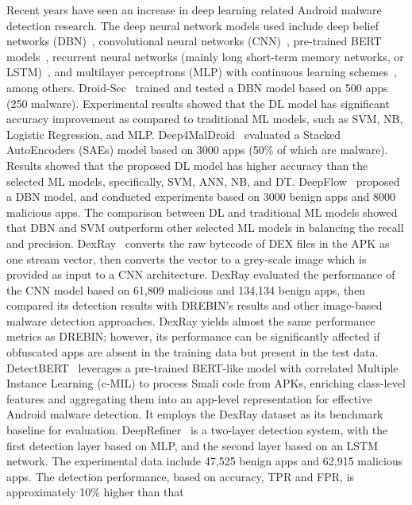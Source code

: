 Recent years have seen an increase in deep learning related Android malware detection
research.  The deep neural network models used include deep belief
networks (DBN)~\cite{Yuan:SIGCOMM14, Su:TrustCom16}, convolutional
neural networks (CNN)~\cite{McLaughlin:CODASPY17, Karbab:DFRWS18,Nadia:MALHat21, Arslan:CCPE22}, pre-trained BERT models~\cite{Sun:esem24},
recurrent neural networks (mainly long short-term memory networks, or
LSTM)~\cite{Vinayakumar:JIFS18, Xiao:MTA19}, and multilayer perceptrons (MLP) with continuous learning schemes~\cite{Chen:USENIX23}, among others.
Droid-Sec~\cite{Yuan:SIGCOMM14} trained and tested a DBN model based on 500 apps (250 malware). Experimental results
showed that the DL model has significant accuracy improvement as
compared to traditional ML models, such as SVM, NB, Logistic
Regression, and MLP.
Deep4MalDroid~\cite{Hou:WIW16} evaluated a Stacked AutoEncoders (SAEs) model based on 3000
apps (50\% of which are malware). Results showed that the proposed
DL model has higher accuracy than the selected ML
models, specifically, SVM, ANN, NB, and DT.
DeepFlow~\cite{Zhu:ISCC17} proposed a DBN model, and
conducted experiments based on 3000 benign apps and 8000 malicious
apps. The comparison between DL and traditional ML models showed that
DBN and SVM outperform other selected ML models in balancing the
recall and precision.
DexRay~\cite{Nadia:MALHat21} converts the raw bytecode of DEX
  files in the APK as one stream vector, then converts the vector to a
  grey-scale image which is provided as input to a CNN
  architecture. DexRay evaluated the performance of the CNN model based on 61,809
  malicious and 134,134 benign apps, then compared its detection
  results with DREBIN's results and other image-based malware detection
  approaches. DexRay yields almost the same performance metrics as DREBIN; however, its performance can be significantly affected if obfuscated apps are absent in the training data but present in the test data. DetectBERT~\cite{Sun:esem24} leverages a pre-trained BERT-like model with correlated Multiple Instance Learning (c-MIL) to process Smali code from APKs, enriching class-level features and aggregating them into an app-level representation for effective Android malware detection. It employs the DexRay dataset as its benchmark baseline for evaluation.
DeepRefiner~\cite{Xu:EuroS&P18} is a two-layer
detection system, with the first detection layer based on MLP, and the
second layer based on an LSTM network. The experimental data include 47,525
benign apps and 62,915 malicious apps. The detection performance,
based on accuracy, TPR and FPR, is approximately 10\% higher than that
